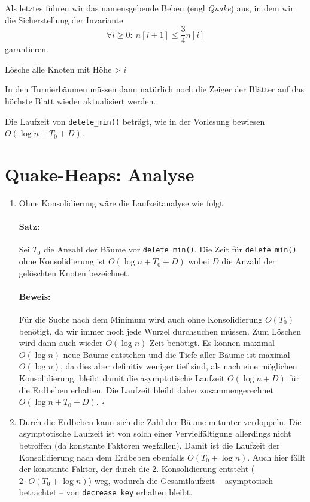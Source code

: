 \documentclass[a4paper,10pt]{article}
\begin{document}
\begin{description}
\begin{algorithmic}
        \ENDWHILE
    \ENDFOR
    \end{algorithmic}
    Als letztes führen wir das namensgebende Beben (engl \emph{Quake}) aus, in dem wir die Sicherstellung der Invariante
    \[\forall i \geq 0{:}\ n[i+1] \leq \frac{3}{4} n[i]\]
    garantieren.
    \begin{algorithmic}
            \STATE Lösche alle Knoten mit Höhe > $i$
        \ENDIF
    \ENDFOR
    \end{algorithmic}
    In den Turnierbäumen müssen dann natürlich noch die Zeiger der Blätter auf das höchste Blatt wieder aktualisiert werden.
    
    Die Laufzeit von \verb!delete_min()! beträgt, wie in der Vorlesung bewiesen $O(\log n + T_0 + D)$.
\end{description}

\section{Quake-Heaps: Analyse}
\begin{enumerate}
\item   Ohne Konsolidierung wäre die Laufzeitanalyse wie folgt:
        \paragraph*{Satz:} Sei $T_0$ die Anzahl der Bäume vor \verb!delete_min()!. Die Zeit für \verb!delete_min()! ohne Konsolidierung ist $O(\log n + T_0 + D)$ wobei $D$ die Anzahl der gelöschten Knoten bezeichnet.
        \paragraph*{Beweis:} Für die Suche nach dem Minimum wird auch ohne Konsolidierung $O(T_0)$ benötigt, da wir immer noch jede Wurzel durchsuchen müssen.
        Zum Löschen wird dann auch wieder $O(\log n)$ Zeit benötigt.
        Es können maximal $O(\log n)$ neue Bäume entstehen und die Tiefe aller Bäume ist maximal $O(\log n)$, da dies aber definitiv weniger tief sind, als nach eine möglichen Konsolidierung, bleibt damit die asymptotische Laufzeit $O(\log n + D)$ für die Erdbeben erhalten.
        Die Laufzeit bleibt daher zusammengerechnet $O(\log n + T_0 + D)$. \hfill $\square$
\item   Durch die Erdbeben kann sich die Zahl der Bäume mitunter verdoppeln. 
        Die asymptotische Laufzeit ist von solch einer Vervielfältigung allerdings nicht betroffen (da konstante Faktoren wegfallen).
        Damit ist die Laufzeit der Konsolidierung nach dem Erdbeben ebenfalls $O(T_0 + \log n)$.
        Auch hier fällt der konstante Faktor, der durch die 2. Konsolidierung entsteht ($2 \cdot O(T_0 + \log n)$) weg, wodurch die Gesamtlaufzeit -- asymptotisch betrachtet -- von \verb!decrease_key! erhalten bleibt.
\end{enumerate}
\end{document}
